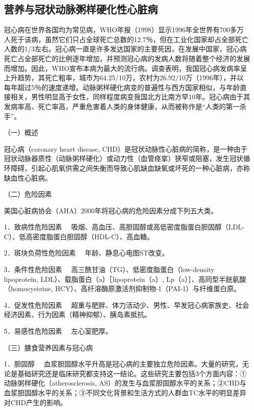 \hypertarget{text00004.htmlux5cux23mllj7}{%
\subsection{营养与冠状动脉粥样硬化性心脏病}\label{text00004.htmlux5cux23mllj7}}

冠心病在世界各国均为常见病，WHO年报（1998）显示1996年全世界有700多万人死于该病，虽然它们只占全球死亡总数的12.7％，但在工业化国家却占全部死亡人数的1/3左右。冠心病一直是许多发达国家的主要死因，在发展中国家，冠心病死亡占全部死亡的比例逐年增加，并预测冠心病的发病人数将随着整个经济的发展而增加。因此，WHO宣布本病为最大的流行病。调查表明，我国冠心病发病率呈上升趋势，其死亡粗率，城市为64.25/10万，农村为26.92/10万（1996年），并以每年超过5％的速度递增。动脉粥样硬化病变的普遍性与西方国家相似，与年龄直接相关，男性明显高于女性，同样程度病变我国北方比南方早10年。冠心病由于其发病率高、死亡率高，严重危害着人类的身体健康，从而被称作是“人类的第一杀手”。

（一）概述

冠心病（coronary heart disease,
CHD）是冠状动脉性心脏病的简称，是一种由于冠状动脉器质性（动脉粥样硬化）或动力性（血管痉挛）狭窄或阻塞，发生冠状循环障碍，引起心肌氧供需之间失衡而导致心肌缺血缺氧或坏死的一种心脏病，亦称缺血性心脏病。

（二）危险因素

美国心脏病协会（AHA）2000年将冠心病的危险因素分成下列五大类。

{1．致病性危险因素}
　吸烟、高血压、高胆固醇或高低密度脂蛋白胆固醇（LDL-C）、低高密度脂蛋白胆固醇（HDL-C）、高血糖。

{2．斑块负荷性危险因素} 　年龄、静息心电图ST改变。

{3．条件性危险因素} 　高三酰甘油（TG）、低密度脂蛋白（low-density
lipoprotein, LDL）、载脂蛋白（a）［lipoprotein（a）,
Lp（a）］、高同型半胱氨酸（homocysteine,
HCY）、高纤溶酶原激活剂抑制物-1（PAI-1）与纤维蛋白原。

{4．促发性危险因素}
　超重与肥胖、体力活动少、男性、早发冠心病家族史、社会经济因素、行为因素（精神抑郁）、胰岛素抵抗。

{5．易感性危险因素} 　左心室肥厚。

（三）膳食营养因素与冠心病

{1．胆固醇}
　血浆胆固醇水平升高是冠心病的主要独立危险因素。大量的研究，无论是基础研究还是临床研究都支持这一结论。这些研究主要包括3个方面内容：①动脉粥样硬化（atherosclerosis,
AS）的发生与血浆胆固醇水平的关系；②CHD与血浆胆固醇水平的关系；③不同文化背景和生活方式的人群血TC水平的明显差异对CHD产生的影响。

